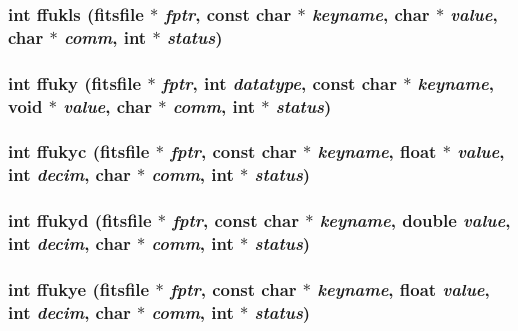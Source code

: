 \subsubsection{\setlength{\rightskip}{0pt plus 5cm}int ffukls (\bf{fitsfile} $\ast$ {\em fptr}, const char $\ast$ {\em keyname}, char $\ast$ {\em value}, char $\ast$ {\em comm}, int $\ast$ {\em status})}\label{fitsio__64_8h_395b4140820c02fa55e498ddd6d95943}


\subsubsection{\setlength{\rightskip}{0pt plus 5cm}int ffuky (\bf{fitsfile} $\ast$ {\em fptr}, int {\em datatype}, const char $\ast$ {\em keyname}, void $\ast$ {\em value}, char $\ast$ {\em comm}, int $\ast$ {\em status})}\label{fitsio__64_8h_a402f603cec33c59a9b6dec08dc7d35e}


\subsubsection{\setlength{\rightskip}{0pt plus 5cm}int ffukyc (\bf{fitsfile} $\ast$ {\em fptr}, const char $\ast$ {\em keyname}, float $\ast$ {\em value}, int {\em decim}, char $\ast$ {\em comm}, int $\ast$ {\em status})}\label{fitsio__64_8h_ded0f88f0f2938fd23a49b55afd453c4}


\subsubsection{\setlength{\rightskip}{0pt plus 5cm}int ffukyd (\bf{fitsfile} $\ast$ {\em fptr}, const char $\ast$ {\em keyname}, double {\em value}, int {\em decim}, char $\ast$ {\em comm}, int $\ast$ {\em status})}\label{fitsio__64_8h_07915bf0e4579bc324d213671d1d6f32}


\subsubsection{\setlength{\rightskip}{0pt plus 5cm}int ffukye (\bf{fitsfile} $\ast$ {\em fptr}, const char $\ast$ {\em keyname}, float {\em value}, int {\em decim}, char $\ast$ {\em comm}, int $\ast$ {\em status})}\label{fitsio__64_8h_7d74546a4ae0316680f0d5b12899f2a5}



